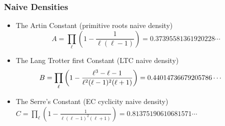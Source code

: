 \documentclass[10pt,handout]{beamer} %
\newcommand{\Q}{\mathbb Q}
\newcommand{\F}{\mathbb F}
\theoremstyle{definition}
\begin{document}
\begin{frame}
\frametitle{Naive Densities}\pause

\begin{itemize}[<+-|alert@+>]
\item \textcolor{red!70!black}{The Artin Constant} (primitive roots naive density)
$$A=\prod_\ell\left(
1-\frac1{\ell(\ell-1)}\right)=0.37395581361920228\cdots$$
\item\textcolor{red!70!black}{The Lang Trotter first Constant} (LTC naive density)
$$\hspace*{-14pt} B=\prod_\ell\left(
1-\frac{\ell^3-\ell-1}{\ell^2(\ell-1)^2(\ell+1)}\right)=0.44014736679205786\cdots$$
\item \textcolor{red!70!black}{The Serre's Constant} (EC cyclicity naive density)
$C=\prod_\ell\left(
 1-\frac1{\ell(\ell-1)^2(\ell+1)}\right)= 0.81375190610681571\cdots$
\end{itemize}
\end{frame}
\end{document}
